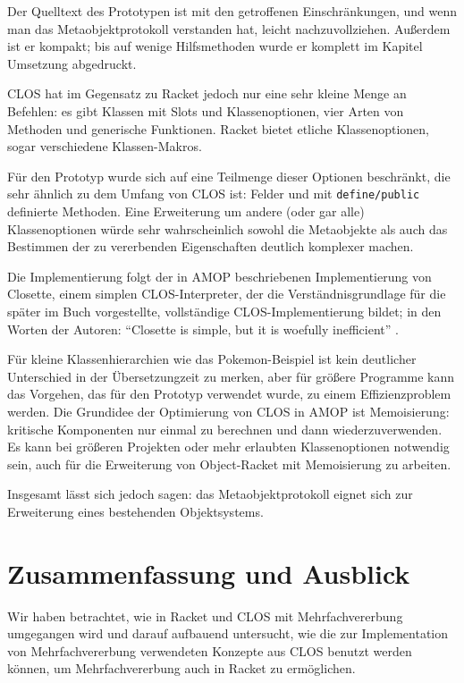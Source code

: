 Der Quelltext des Prototypen ist mit den getroffenen Einschränkungen, und wenn man das Metaobjektprotokoll verstanden hat, leicht nachzuvollziehen. Außerdem ist er kompakt; bis auf wenige Hilfsmethoden wurde er komplett im Kapitel Umsetzung abgedruckt.

CLOS hat im Gegensatz zu Racket jedoch nur eine sehr kleine Menge an Befehlen: es gibt Klassen mit Slots und Klassenoptionen, vier Arten von Methoden und generische Funktionen. Racket bietet etliche Klassenoptionen, sogar verschiedene Klassen-Makros.

Für den Prototyp wurde sich auf eine Teilmenge dieser Optionen beschränkt, die sehr ähnlich zu dem Umfang von CLOS ist: Felder und mit \texttt{define/public} definierte Methoden. Eine Erweiterung um andere (oder gar alle) Klassenoptionen würde sehr wahrscheinlich sowohl die Metaobjekte als auch das Bestimmen der zu vererbenden Eigenschaften deutlich komplexer machen. 

Die Implementierung folgt der in AMOP beschriebenen Implementierung von Closette, einem simplen CLOS-Interpreter, der die Verständnisgrundlage für die später im Buch vorgestellte, vollständige CLOS-Implementierung bildet; in den Worten der Autoren: ``Closette is simple, but it is woefully inefficient'' \cite[S.45]{amop}.

Für kleine Klassenhierarchien wie das Pokemon-Beispiel ist kein deutlicher Unterschied in der Übersetzungzeit zu merken, aber für größere Programme kann das Vorgehen, das für den Prototyp verwendet wurde, zu einem Effizienzproblem werden. Die Grundidee der Optimierung von CLOS in AMOP ist Memoisierung: kritische Komponenten nur einmal zu berechnen und dann wiederzuverwenden. Es kann bei größeren Projekten oder mehr erlaubten Klassenoptionen notwendig sein, auch für die Erweiterung von Object-Racket mit Memoisierung zu arbeiten.

Insgesamt lässt sich jedoch sagen: das Metaobjektprotokoll eignet sich zur Erweiterung eines bestehenden Objektsystems.

\chapter{Zusammenfassung und Ausblick}
Wir haben betrachtet, wie in Racket und CLOS mit Mehrfachvererbung umgegangen wird und darauf aufbauend untersucht, wie die zur Implementation von Mehrfachvererbung verwendeten Konzepte aus CLOS benutzt werden können, um Mehrfachvererbung auch in Racket zu ermöglichen.

